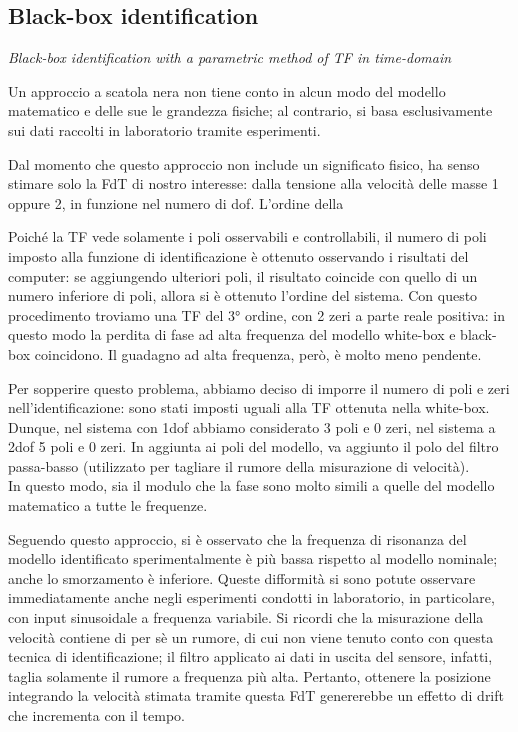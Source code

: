 \subsection{Black-box identification}

\textit{Black-box identification with a parametric method of TF in time-domain}
\\ \par Un approccio a scatola nera non tiene conto in alcun modo del modello matematico e delle sue le grandezza fisiche; al contrario, si basa esclusivamente sui dati raccolti in laboratorio tramite esperimenti.


Dal momento che questo approccio non include un significato fisico, ha senso stimare solo la FdT di nostro interesse: dalla tensione alla velocità delle masse 1 oppure 2, in funzione nel numero di dof. 
L'ordine della 





Poiché la TF vede solamente i poli osservabili e controllabili, il numero di poli imposto alla funzione di identificazione è ottenuto osservando i risultati del computer: se aggiungendo ulteriori poli, il risultato coincide con quello di un numero inferiore di poli, allora si è ottenuto l'ordine del sistema.
Con questo procedimento troviamo una TF del 3° ordine, con 2 zeri a parte reale positiva: in questo modo la perdita di fase ad alta frequenza del modello white-box e black-box coincidono. Il guadagno ad alta frequenza, però, è molto meno pendente.

Per sopperire questo problema, abbiamo deciso di imporre il numero di poli e zeri nell'identificazione: sono stati imposti uguali alla TF ottenuta nella white-box. Dunque, nel sistema con 1dof abbiamo considerato 3 poli e 0 zeri, nel sistema a 2dof 5 poli e 0 zeri.
In aggiunta ai poli del modello, va aggiunto il polo del filtro passa-basso (utilizzato per tagliare il rumore della misurazione di velocità). \\
In questo modo, sia il modulo che la fase sono molto simili a quelle del modello matematico a tutte le frequenze.

Seguendo questo approccio, si è osservato che la frequenza di risonanza del modello identificato sperimentalmente è più bassa rispetto al modello nominale; anche lo smorzamento è inferiore.
Queste difformità si sono potute osservare immediatamente anche negli esperimenti condotti in laboratorio, in particolare, con input sinusoidale a frequenza variabile.
Si ricordi che la misurazione della velocità contiene di per sè un rumore, di cui non viene tenuto conto con questa tecnica di identificazione; il filtro applicato ai dati in uscita del sensore, infatti, taglia solamente il rumore a frequenza più alta.
Pertanto, ottenere la posizione integrando la velocità stimata tramite questa FdT genererebbe un effetto di drift che incrementa con il tempo.

